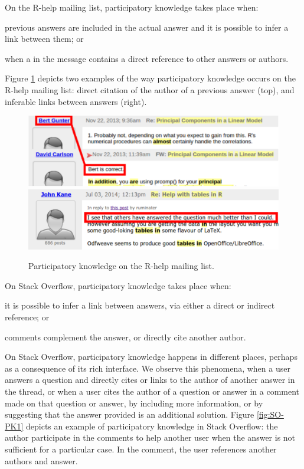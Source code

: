     On the R-help mailing list, participatory knowledge takes place when:
    \begin{enumerate*}[label=(\arabic*)]
    \item previous answers are included in the actual answer and it is possible to infer a link between them; or
    \item when a in the message contains a direct reference to other answers or authors.
    \end{enumerate*}
    Figure \ref{fig:ML-PK1} depicts two examples of the way participatory knowledge occurs on the R-help mailing list:
    direct citation of the author of a previous answer (top), and inferable links between answers (right).

    
    \begin{figure}[!htb]
        \centering
        \includegraphics[width=.85\columnwidth]{Figures/ML-PKimg2}
        \includegraphics[width=.85\columnwidth]{Figures/ML-PKimg11}
        \caption[Participatory knowledge on the R-help mailing list.]{Participatory knowledge on the R-help mailing list.}
        \label{fig:ML-PK1}
    \end{figure}

    On Stack Overflow, participatory knowledge takes place when:
    \begin{enumerate*}[label=(\arabic*)]
    \item it is possible to infer a link between answers, via either a direct or indirect reference; or
    \item comments complement the answer, or directly cite another author.
    \end{enumerate*}

    On Stack Overflow, participatory knowledge happens in different places, perhaps as a consequence of its rich interface.
    We observe this phenomena, when a user answers a question and directly cites or links to the author of another answer in the thread, or when a user cites the author of a question or answer in a comment made on that question or answer, by including more information, or by suggesting that the answer provided is an additional solution.
    Figure \ref{fig:SO-PK1} depicts an example of participatory knowledge in Stack Overflow: the author participate in the comments to help another user when the answer is not sufficient for a particular case.
    In the comment, the user references another authors and answer.

